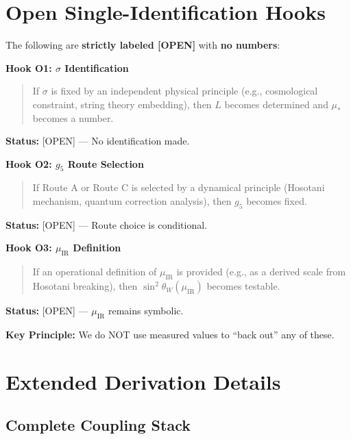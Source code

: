 \documentclass[11pt,a4paper]{article}
\theoremstyle{definition}
\begin{document}
\section{Open Single-Identification Hooks}
\label{app:open}

\begin{openbox}
The following are \textbf{strictly labeled [OPEN]} with \textbf{no numbers}:

\textbf{Hook O1: $\sigma$ Identification}
\begin{quote}
If $\sigma$ is fixed by an independent physical principle (e.g., cosmological constraint,
string theory embedding), then $L$ becomes determined and $\mu_*$ becomes a number.
\end{quote}
\textbf{Status:} [OPEN] --- No identification made.

\textbf{Hook O2: $g_5$ Route Selection}
\begin{quote}
If Route A or Route C is selected by a dynamical principle (Hosotani mechanism,
quantum correction analysis), then $g_5$ becomes fixed.
\end{quote}
\textbf{Status:} [OPEN] --- Route choice is conditional.

\textbf{Hook O3: $\mu_{\text{IR}}$ Definition}
\begin{quote}
If an operational definition of $\mu_{\text{IR}}$ is provided (e.g., as a derived scale
from Hosotani breaking), then $\sin^2\theta_W(\mu_{\text{IR}})$ becomes testable.
\end{quote}
\textbf{Status:} [OPEN] --- $\mu_{\text{IR}}$ remains symbolic.

\textbf{Key Principle:} We do NOT use measured values to ``back out'' any of these.
\end{openbox}

\section{Extended Derivation Details}
\label{app:extended}

\subsection{Complete Coupling Stack}
\label{subsec:coupling_stack}
\end{document}
